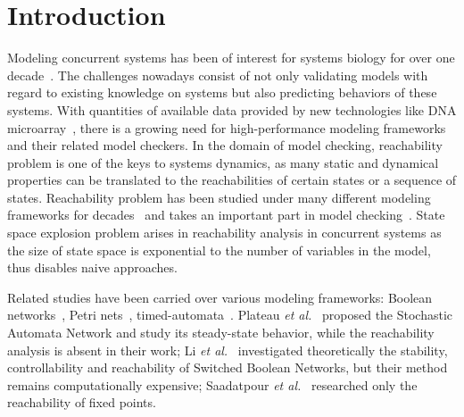 \documentclass[runningheads]{llncs}
\begin{document}
\section{Introduction}
\label{intro}
Modeling concurrent systems has been of interest for systems biology for over one decade~\cite{bockmayr2002using,bortolussi2008modeling,wiley2003computational}. 
The challenges nowadays consist of not only validating models with regard to existing knowledge on systems but also predicting behaviors of these systems. 
With quantities of available data provided by new technologies like DNA microarray~\cite{marx2013}, there is a growing need for high-performance modeling frameworks and their related model checkers.
In the domain of model checking, reachability problem is one of the keys to systems dynamics, as many static and dynamical properties can be translated to the reachabilities of certain states or a sequence of states.
Reachability problem has been studied under many different modeling frameworks for decades~\cite{akutsu2007control,barrett2006complexity,Daws1998,esparza1998,mayr1984,wozna2003} and takes an important part in model checking~\cite{clarke2008birth,clarke20142}. 
State space explosion problem arises in reachability analysis in concurrent systems as the size of state space is exponential to the number of variables in the model, thus disables naive approaches. 

Related studies have been carried over various modeling frameworks: Boolean networks~\cite{akutsu2007control}, Petri nets~\cite{mayr1984,esparza1998}, timed-automata~\cite{Daws1998,wozna2003}. 
Plateau \textit{et al.}~\cite{plateau1991stochastic} proposed the Stochastic Automata Network and study its steady-state behavior, while the reachability analysis is absent in their work; 
Li \textit{et al.}~\cite{li2012reachability,li2014stability} investigated theoretically the stability, controllability and reachability of Switched Boolean Networks, but their method remains computationally expensive;
Saadatpour \textit{et al.}~\cite{saadatpour2010attractor} researched only the reachability of fixed points.
\end{document}

